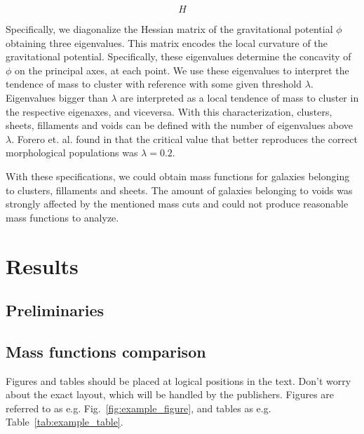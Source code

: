 \documentclass[a4paper,fleqn,usenatbib]{mnras}
\begin{document}
\begin{equation}
H
\label{eq:hessian}
\end{equation}

Specifically, we diagonalize the Hessian matrix of the gravitational
potential $\phi$ obtaining three eigenvalues.  
This matrix encodes the local curvature of the gravitational
potential.  
Specifically, these eigenvalues determine the concavity of $\phi$ on
the principal axes, at each point.  
We use these eigenvalues to interpret the tendence of mass to cluster
with reference with some given threshold $\lambda$.  
Eigenvalues bigger than $\lambda$ are interpreted as a local tendence
of mass to cluster in the respective eigenaxes, and viceversa.  
With this characterization, clusters, sheets, fillaments and voids can
be defined with the number of eigenvalues above $\lambda$. 
Forero et. al. found in \cite{Forero2009} that the critical value that
better reproduces the correct morphological populations was $\lambda =
0.2$. 

With these specifications, we could obtain mass functions for galaxies
belonging to clusters, fillaments and sheets. The amount of galaxies
belonging to voids was strongly affected by the mentioned mass cuts
and could not produce reasonable mass functions to analyze. 

\section{Results}
\subsection{Preliminaries}

\subsection{Mass functions comparison}

Figures and tables should be placed at logical positions in the text. Don't
worry about the exact layout, which will be handled by the publishers.
Figures are referred to as e.g. Fig.~\ref{fig:example_figure}, and tables as
e.g. Table~\ref{tab:example_table}.
\end{document}
